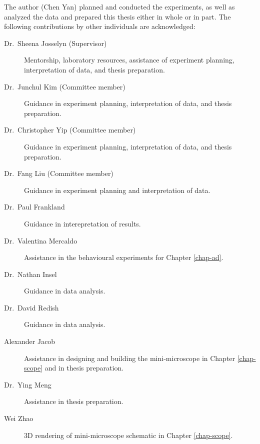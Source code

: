 The author (Chen Yan) planned and conducted the experiments, as well as analyzed the data and prepared this thesis either in whole or in part. The following contributions by other individuals are acknowledged:
\begin{description}

\item[Dr.~Sheena Josselyn (Supervisor)] Mentorship, laboratory resources, assistance of experiment planning, interpretation of data, and thesis preparation.

\item[Dr.~Junchul Kim (Committee member)] Guidance in experiment planning, interpretation of data, and thesis preparation.

\item[Dr.~Christopher Yip (Committee member)] Guidance in experiment planning, interpretation of data, and thesis preparation.
\item[Dr.~Fang Liu (Committee member)] Guidance in experiment planning and interpretation of data.

\item[Dr.~Paul Frankland] Guidance in interepretation of results.

\item[Dr.~Valentina Mercaldo] Assistance in the behavioural experiments for Chapter \ref{chap-ad}.

\item[Dr.~Nathan Insel] Guidance in data analysis.

\item[Dr.~David Redish] Guidance in data analysis. 

\item[Alexander Jacob] Assistance in designing and building the mini-microscope in Chapter \ref{chap-scope} and in thesis preparation.
\item[Dr.~Ying Meng] Assistance in thesis preparation.
\item[Wei Zhao] 3D rendering of mini-microscope schematic in Chapter \ref{chap-scope}.



\end{description}
